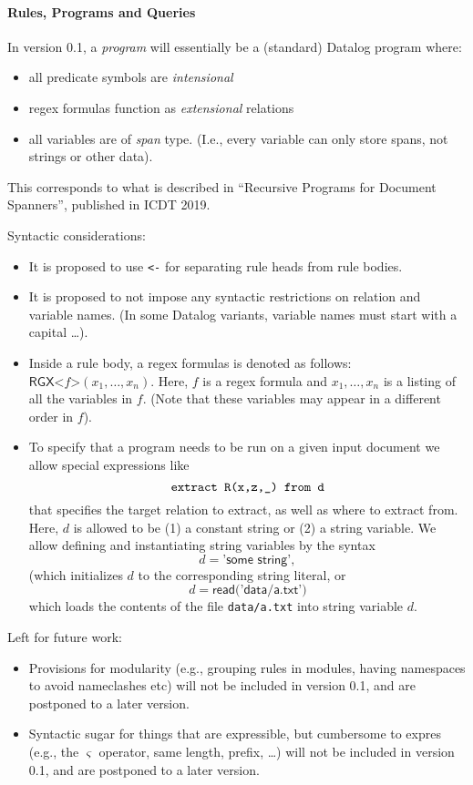 \documentclass[a4paper,11pt,pdftex]{article}
\begin{document}
\paragraph*{Rules, Programs and Queries}
\label{sec:rules}

In version 0.1, a \emph{program} will essentially be a (standard) Datalog program where:
\begin{itemize}
\item all predicate symbols are \emph{intensional}
\item regex formulas function as \emph{extensional} relations
\item all variables are of \emph{span} type. (I.e., every variable can only store spans, not strings or other data).
\end{itemize}
This corresponds to what is described in ``Recursive Programs for Document Spanners'', published in ICDT 2019.

\smallskip
Syntactic considerations:
\begin{itemize}
\item It is proposed to use \verb!<-! for separating rule heads from rule bodies.
\item It is proposed to not impose any syntactic restrictions on relation and variable names.  (In some Datalog variants, variable names must start with a capital \dots).
\item Inside a rule body, a regex formulas is denoted as follows:  $\textsf{RGX}\texttt{<}f\texttt{>}(x_1,\dots,x_n)$. Here, $f$ is a regex formula and $x_1, \dots, x_n$ is a listing of all the variables in $f$. (Note that these variables may appear in a different order in $f$).
\item To specify that a program needs to be run on a given input document we allow special expressions like \[ \verb!extract R(x,z,_) from d!\]  that specifies the target relation to extract, as well as where to extract from. Here, $d$ is allowed to be (1) a constant string or (2) a string variable. We allow defining and instantiating string variables by the syntax
  \[ d= \textsf{'some string'},\]
  (which initializes $d$ to the corresponding string literal, or \[ d = \textsf{read('data/a.txt')}\]
  which loads the contents of the file \verb!data/a.txt! into string variable $d$.
\end{itemize}

\smallskip


Left for future work:
\begin{itemize}
\item Provisions for modularity (e.g., grouping rules in modules, having namespaces to avoid nameclashes etc) will not be included in version 0.1, and are postponed to a later version.
\item Syntactic sugar for things that are expressible, but cumbersome to expres (e.g., the $\varsigma$ operator, same length, prefix, \dots)  will not be included in version 0.1, and are postponed to a later version.
\end{itemize}

 




\end{document}
